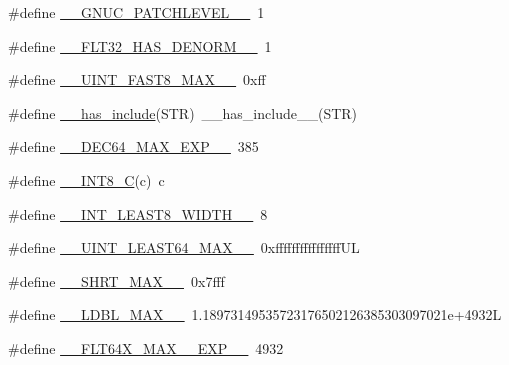 \begin{DoxyCompactItemize}
\item 
\#define \hyperlink{cmake-build-debug_2babel__client__autogen_2moc__predefs_8h_ad149c0565fcf669b23f483e5b7f80dbd}{\+\_\+\+\_\+\+G\+N\+U\+C\+\_\+\+P\+A\+T\+C\+H\+L\+E\+V\+E\+L\+\_\+\+\_\+}~1
\item 
\#define \hyperlink{cmake-build-debug_2babel__client__autogen_2moc__predefs_8h_ac1175c9478c586edee06d1f788a03b83}{\+\_\+\+\_\+\+F\+L\+T32\+\_\+\+H\+A\+S\+\_\+\+D\+E\+N\+O\+R\+M\+\_\+\+\_\+}~1
\item 
\#define \hyperlink{cmake-build-debug_2babel__client__autogen_2moc__predefs_8h_a27b5eb7cfda61c7f1baeb4d95f3052bb}{\+\_\+\+\_\+\+U\+I\+N\+T\+\_\+\+F\+A\+S\+T8\+\_\+\+M\+A\+X\+\_\+\+\_\+}~0xff
\item 
\#define \hyperlink{cmake-build-debug_2babel__client__autogen_2moc__predefs_8h_a1c6886956b05c16006d924f77a868410}{\+\_\+\+\_\+has\+\_\+include}(S\+TR)~\+\_\+\+\_\+has\+\_\+include\+\_\+\+\_\+(S\+TR)
\item 
\#define \hyperlink{cmake-build-debug_2babel__client__autogen_2moc__predefs_8h_a3d4fe0f0b2e3ae12569d4a663dee8a0c}{\+\_\+\+\_\+\+D\+E\+C64\+\_\+\+M\+A\+X\+\_\+\+E\+X\+P\+\_\+\+\_\+}~385
\item 
\#define \hyperlink{cmake-build-debug_2babel__client__autogen_2moc__predefs_8h_ad36bc14a0433c9f88496bed4ccbd65a3}{\+\_\+\+\_\+\+I\+N\+T8\+\_\+C}(c)~c
\item 
\#define \hyperlink{cmake-build-debug_2babel__client__autogen_2moc__predefs_8h_a967b4ada96d28b97bc07e26e1def8e66}{\+\_\+\+\_\+\+I\+N\+T\+\_\+\+L\+E\+A\+S\+T8\+\_\+\+W\+I\+D\+T\+H\+\_\+\+\_\+}~8
\item 
\#define \hyperlink{cmake-build-debug_2babel__client__autogen_2moc__predefs_8h_a4bf843ffcadf9b162b74c1b7e546e8e9}{\+\_\+\+\_\+\+U\+I\+N\+T\+\_\+\+L\+E\+A\+S\+T64\+\_\+\+M\+A\+X\+\_\+\+\_\+}~0xffffffffffffffff\+UL
\item 
\#define \hyperlink{cmake-build-debug_2babel__client__autogen_2moc__predefs_8h_a4f69990d03f9fb0c390a6fbad28a737b}{\+\_\+\+\_\+\+S\+H\+R\+T\+\_\+\+M\+A\+X\+\_\+\+\_\+}~0x7fff
\item 
\#define \hyperlink{cmake-build-debug_2babel__client__autogen_2moc__predefs_8h_a06fd91f0507a4f364e469c8055f4265a}{\+\_\+\+\_\+\+L\+D\+B\+L\+\_\+\+M\+A\+X\+\_\+\+\_\+}~1.\+18973149535723176502126385303097021e+4932L
\item 
\#define \hyperlink{cmake-build-debug_2babel__client__autogen_2moc__predefs_8h_af707469f32a983b229e6c7e0e4efc063}{\+\_\+\+\_\+\+F\+L\+T64\+X\+\_\+\+M\+A\+X\+\_\+\_\+\+E\+X\+P\+\_\+\+\_\+}~4932

\end{DoxyCompactItemize}
